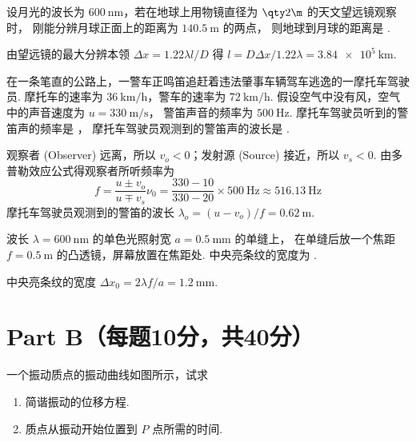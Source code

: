 \begin{problem}
  设月光的波长为 $\qty{600}\nm$，若在地球上用物镜直径为 $\qty2\m$ 的天文望远镜观察时，
  刚能分辨月球正面上的距离为 $\qty{140.5}\m$ 的两点，
  则地球到月球的距离是 .
\end{problem}
\begin{solution}
  由望远镜的最大分辨本领 $\Delta x = 1.22\lambda l/D$ 得
  $l = D\Delta x/1.22\lambda = \qty{3.84e5}\km$.
\end{solution}

\begin{problem}
  在一条笔直的公路上，一警车正鸣笛追赶着违法肇事车辆驾车逃逸的一摩托车驾驶员.
  摩托车的速率为 $\qty{36}{\km/\hour}$，警车的速率为 $\qty{72}{\km/\hour}$.
  假设空气中没有风，空气中的声音速度为 $u = \qty{330}{\m/\s}$，
  警笛声音的频率为 $\qty{500}\Hz$.
  摩托车驾驶员听到的警笛声的频率是 ，
  摩托车驾驶员观测到的警笛声的波长是 .
\end{problem}
\begin{solution}
  观察者 (Observer) 远离，所以 $v_o < 0$；发射源 (Source) 接近，所以 $v_s < 0$.
  由多普勒效应公式得观察者所听频率为
  \[
    f = \frac{u \pm v_o}{u \mp v_s}\nu_0
      = \frac{330 - 10}{330 - 20} \times \qty{500}\Hz \approx \qty{516.13}\Hz
  \]
  摩托车驾驶员观测到的警笛的波长 $\lambda_o = (u - v_o)/f = \qty{0.62}\m$.
\end{solution}

\begin{problem}
  波长 $\lambda = \qty{600}\nm$ 的单色光照射宽 $a = \qty{0.5}\mm$ 的单缝上，
  在单缝后放一个焦距 $f = \qty{0.5}\m$ 的凸透镜，屏幕放置在焦距处.
  中央亮条纹的宽度为 .
\end{problem}
\begin{solution}
  中央亮条纹的宽度 $\Delta x_0 = 2\lambda f/a = \qty{1.2}\mm$.
\end{solution}

\section{Part B（每题10分，共40分）}

\begin{textfig}
  \begin{problem}
    一个振动质点的振动曲线如图所示，试求
    \begin{enumerate}
      \item 简谐振动的位移方程.
      \item 质点从振动开始位置到 $P$ 点所需的时间.
    \end{enumerate}
  \end{problem}
  \textfigsplit\centering
\end{textfig}

